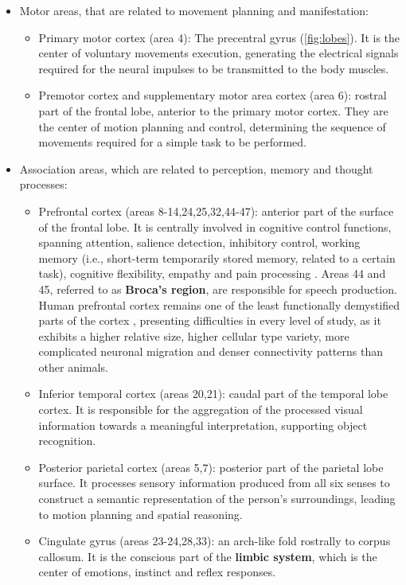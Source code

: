 \begin{itemize}
	\item{Motor areas, that are related to movement planning and manifestation:
	\begin{itemize}
		\item {Primary motor cortex (area 4): The precentral gyrus (\autoref{fig:lobes}). It is the center of voluntary movements execution, generating the electrical signals required for the neural impulses to be transmitted to the body muscles. }
		\item {Premotor cortex and supplementary motor area cortex (area 6): rostral part of the frontal lobe, anterior to the primary motor cortex. They are the center of motion planning and control, determining the sequence of movements required for a simple task to be performed.}
	\end{itemize}}
	\item{Association areas, which are related to perception, memory and thought processes:
	\begin{itemize}
		\item{Prefrontal cortex (areas 8-14,24,25,32,44-47): anterior part of the surface of the frontal lobe. It is centrally involved in cognitive control functions, spanning attention, salience detection, inhibitory control, working memory (i.e., short-term temporarily stored memory, related to a certain task), cognitive flexibility, empathy and pain processing \cite{Ong2019}. Areas 44 and 45, referred to as \textbf{Broca's region}, are responsible for speech production. Human prefrontal cortex remains one of the least functionally demystified parts of the cortex , presenting difficulties in every level of study, as it exhibits a higher relative size, higher cellular type variety, more complicated neuronal migration and denser connectivity patterns than other animals.\cite{Chini2021}}
		\item {Inferior temporal cortex (areas 20,21): caudal part of the temporal lobe cortex. It is responsible for the aggregation of the processed visual information towards a meaningful interpretation, supporting object recognition.}
		\item {Posterior parietal cortex (areas 5,7): posterior part of the parietal lobe surface. It processes sensory information produced from  all six senses to construct a semantic representation of the person's surroundings, leading to motion planning and spatial reasoning.}
		\item{Cingulate gyrus (areas 23-24,28,33): an arch-like fold rostrally to corpus callosum. It is the conscious part of the \textbf{limbic system}, which is the center of emotions, instinct and reflex responses.}
	\end{itemize}
}	
\end{itemize}

